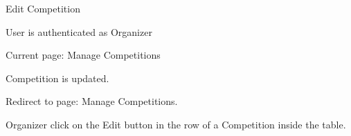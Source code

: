 \begin{uc}{Edit Competition}
    \begin{uc-pre}
    \item User is authenticated as Organizer
    \item Current page: Manage Competitions
    \end{uc-pre}

    \begin{uc-post}
    \item Competition is updated.
    \item Redirect to page: Manage Competitions.
    \end{uc-post}

    \begin{uc-trig}
        Organizer click on the Edit button in the row of a Competition inside the
        table.
    \end{uc-trig}

\end{uc}

